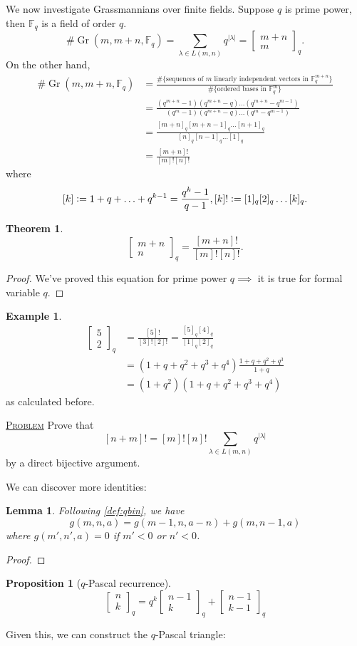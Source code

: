 \documentclass{report}
\newcommand{\F}{\mathbb{F}}
\def \Gr {\operatorname{Gr}}
\newcommand{\qbin}[2]{\begin{bmatrix}{#1}\\ {#2}\end{bmatrix}_q}
\newcommand{\defeq}{\vcentcolon=}
\newcommand{\fancyem}[1]{\underline{\textsc{#1}}}
\newtheorem{theorem}{Theorem}[section]
\newtheorem{lemma}{Lemma}[section]
\newtheorem{proposition}{Proposition}[section]
\theoremstyle{definition}
\newtheorem{example}{Example}[section]
\theoremstyle{remark}
\numberwithin{equation}{section}
\newcommand{\fnl}{\parbox[t]{0\linewidth}{}}
\begin{document}
We now investigate Grassmannians over finite fields. Suppose $q$ is prime power, then $\F_q$ is a field of order $q$. 
\[
    \# \Gr(m, m+n, \F_q) = \sum_{\lambda \in L(m, n)}q^{|\lambda|} = \qbin{m+n}{m}.    
\] On the other hand, \begin{align*}
    \# \Gr(m, m+n, \F_q) & = \frac{\#\{\text{sequences of $m$ linearly independent vectors in $\F_q^{m + n}$}\}}{\#\{\text{ordered bases in $\F_q^m$}\}} \\
    & = \frac{(q^{m+n} - 1)(q^{m+n} - q)\ldots(q^{m+n} - q^{m-1})}{(q^{m} - 1)(q^{m+n} - q)\ldots(q^{m} - q^{m-1})} \\
    & = \frac{[m+n]_q[m+n-1]_q\ldots[n+1]_q}{[n]_q[n-1]_q\ldots[1]_q} \\
    & = \frac{[m+n]!}{[m]![n]!}
\end{align*}
where \[
    [k] \defeq 1 + q + \ldots + q^{k-1} = \frac{q^k - 1}{q - 1}, [k]! \defeq [1]_q[2]_q\ldots[k]_q.
\]
\begin{theorem}\fnl
    \[\qbin{m+n}{n} = \frac{[m+n]!}{[m]![n]!}.\]
\end{theorem}
\begin{proof}
We've proved this equation for prime power $q \implies$ it is true for formal variable $q$. 
\end{proof}
\begin{example}
    \begin{align*}
        \qbin{5}{2} & = \frac{[5]!}{[3]![2]!} = \frac{[5]_q[4]_q}{[1]_q[2]_q}\\
        & = (1 + q + q^2 + q^3 + q^4)\frac{1 + q + q^2 + q^3}{1 + q} \\
        & = (1 + q^2)(1 + q + q^2 + q^3 + q^4)
    \end{align*}
    as calculated before.
\end{example}
\fancyem{Problem} Prove that \[
    [n + m]! = [m]![n]!\sum_{\lambda \in L(m, n)}q^{|\lambda|}    
\] by a direct bijective argument.

We can discover more identities:
\begin{lemma}Following \autoref{def:qbin}, we have
    \[g(m, n, a) = g(m - 1, n, a - n) + g(m, n - 1, a)\]
    where $g(m', n', a) = 0$ if $m' < 0$ or $n' < 0$.
\end{lemma}
\begin{proof}
\end{proof}
\begin{proposition}[$q$-Pascal recurrence]\fnl
    \[\qbin{n}{k} = q^k\qbin{n-1}{k} + \qbin{n-1}{k-1}\]
\end{proposition}
Given this, we can construct the $q$-Pascal triangle:
\end{document}
